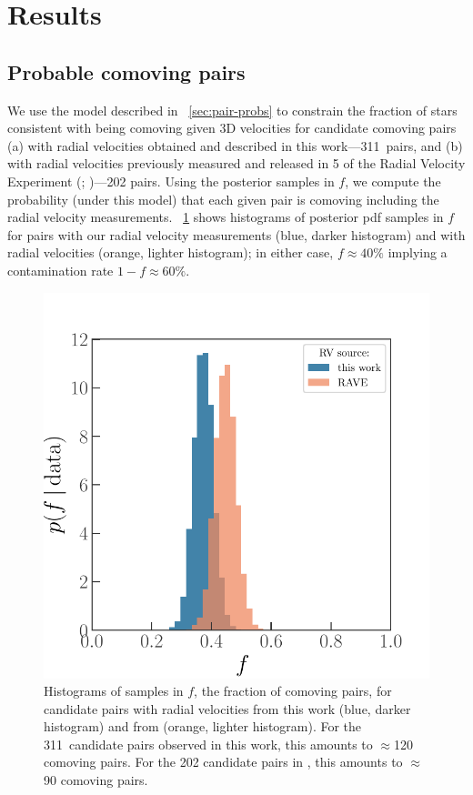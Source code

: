 \documentclass[modern, letterpaper]{aastex61}
\newcommand{\DR}[1]{\acronym{DR}#1}
\newcommand{\npairsobs}{311}
\begin{document}
\section{Results} \label{sec:results}

\subsection{Probable comoving pairs}\label{sec:genuine}

We use the model described in \sectionname~\ref{sec:pair-probs} to constrain the
fraction of stars consistent with being comoving given 3D velocities for
candidate comoving pairs (a) with radial velocities obtained and described in
this work---\npairsobs\ pairs, and (b) with radial velocities previously
measured and released in \DR{5} of the Radial Velocity Experiment
(; \citealt{Kunder:2017})---202 pairs.
Using the posterior samples in $f$, we compute the probability (under this
model) that each given pair is comoving including the radial velocity
measurements.
\figurename~\ref{fig:f-samples} shows histograms of posterior pdf samples in $f$
for pairs with our radial velocity measurements (blue, darker histogram) and
with  radial velocities (orange, lighter histogram); in either
case, $f \approx 40\%$ implying a contamination rate $1-f \approx 60\%$.

\begin{figure}[htb]
  \begin{center}
    \includegraphics[width=0.7\linewidth]{f_samples.pdf}
  \end{center}
  \caption{%
    Histograms of samples in $f$, the fraction of comoving pairs, for candidate
    pairs with radial velocities from this work (blue, darker histogram) and
    from  (orange, lighter histogram).
    For the \npairsobs\ candidate pairs observed in this work, this amounts to
    $\approx$120 comoving pairs.
    For the 202 candidate pairs in , this amounts to $\approx$90
    comoving pairs.
    \label{fig:f-samples}}
\end{figure}
\end{document}
